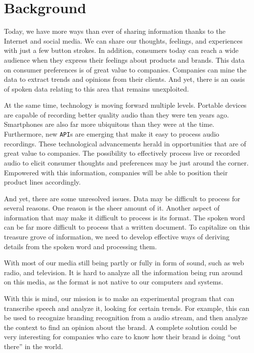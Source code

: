 \documentclass[a4paper,12pt,twoside]{ltxdoc}
\begin{document}
\newpage
\section{Background}
Today, we have more ways than ever of sharing information thanks to the Internet and social media. We can share our
thoughts, feelings, and experiences with just a few button strokes. In addition, consumers today can reach a wide audience
when they express their feelings about products and brands. This data on consumer preferences is of great value to companies.
Companies can mine the data to extract trends and opinions from their clients. And yet, there is an oasis of spoken
data relating to this area that remains unexploited.

At the same time, technology is moving forward multiple levels. Portable devices are capable of recording better quality
audio than they were ten years ago. Smartphones are also far more ubiquitous than they were at the time.
Furthermore, new \verb#API#s are emerging that make it easy to process audio recordings. These technological advancements herald
in opportunities that are of great value to companies. The possibility to effectively process live or recorded audio
to elicit consumer thoughts and preferences may be just around the corner. Empowered with this information, companies will
be able to position their product lines accordingly.

And yet, there are some unresolved issues. Data may be difficult to process for several reasons. One reason is the sheer
amount of it. Another aspect of information that may make it difficult to process is its format. The spoken word can be 
far more difficult to process that a written document. To capitalize on this treasure grove of information, we need
to develop effective ways of deriving details from the spoken word and processing them.

With most of our media still being partly or fully in form of sound, such  as web radio, and television.
It is hard to analyze all the information being run around on this media, as the format is not
native to our computers and systems. 

With this is mind, our mission is to make an experimental program that can transcribe speech and analyze it, looking for certain trends.
For example, this can be used to recognize branding recognition from a audio stream, and then analyze the context to find an opinion about the brand.
A complete solution could be very interesting for companies who care to know how their brand is doing ``out there'' in the world.
\end{document}
